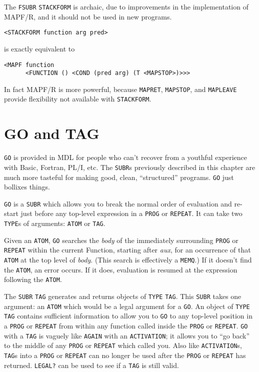 \documentclass[a4paper]{scrbook}
\begin{document}
The \texttt{FSUBR}  \texttt{STACKFORM}  is archaic, due to improvements in
the implementation of MAPF/R, and it should not be used in new programs.

\begin{verbatim}
<STACKFORM function arg pred>
\end{verbatim}

is exactly equivalent to

\begin{verbatim}
<MAPF function
      <FUNCTION () <COND (pred arg) (T <MAPSTOP>)>>>
\end{verbatim}

In fact MAPF/R is more powerful, because \texttt{MAPRET}, \texttt{MAPSTOP}, and \texttt{MAPLEAVE} provide flexibility not
available with \texttt{STACKFORM}.

\section{GO and TAG}\label{go-and-tag}

\texttt{GO}  is provided in MDL for people who can't recover from a youthful experience with
Basic, Fortran, PL/I, etc. The \texttt{SUBR}s previously described in this chapter are much more tasteful for making good,
clean, ``structured'' programs. \texttt{GO} just bollixes things.

\texttt{GO} is a \texttt{SUBR} which allows you to break the normal order of evaluation and re-start just before any
top-level expression in a \texttt{PROG} or \texttt{REPEAT}. It can take two \texttt{TYPE}s of arguments: \texttt{ATOM} or
\texttt{TAG}. 

Given an \texttt{ATOM}, \texttt{GO} searches the \emph{body} of the immediately surrounding \texttt{PROG} or
\texttt{REPEAT} within the current Function, starting after \emph{aux}, for an occurrence of that \texttt{ATOM} at the top
level of \emph{body}. (This search is effectively a \texttt{MEMQ}.) If it doesn't find the \texttt{ATOM}, an error occurs.
If it does, evaluation is resumed at the expression following the \texttt{ATOM}.

The \texttt{SUBR} \texttt{TAG} generates and returns objects of \texttt{TYPE} \texttt{TAG}. This \texttt{SUBR} takes one
argument: an \texttt{ATOM} which would be a legal argument for a \texttt{GO}. An object of \texttt{TYPE} \texttt{TAG}
contains sufficient information to allow you to \texttt{GO} to any top-level position in a \texttt{PROG} or \texttt{REPEAT}
from within any function called inside the \texttt{PROG} or \texttt{REPEAT}. \texttt{GO} with a \texttt{TAG} is vaguely
like \texttt{AGAIN} with an \texttt{ACTIVATION}; it allows you to ``go back'' to the middle of any \texttt{PROG} or
\texttt{REPEAT} which called you. Also like \texttt{ACTIVATION}s, \texttt{TAG}s into a \texttt{PROG} or \texttt{REPEAT} can
no longer be used after the \texttt{PROG} or \texttt{REPEAT} has returned. \texttt{LEGAL?}  can be
used to see if a \texttt{TAG} is still valid.
\end{document}
